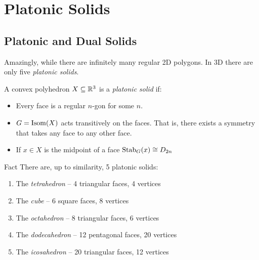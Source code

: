 \documentclass[../main.tex]{subfiles}
\begin{document}
\chapter{Platonic Solids}
\section{Platonic and Dual Solids}
Amazingly, while there are infinitely many regular 2D polygons.
In 3D there are only five \textit{platonic solids}.
\begin{definition}
  A convex polyhedron $X \subseteq \mathbb{R}^3$ is a \textit{platonic solid} if:
  \begin{itemize}
    \item Every face is a regular $n$-gon for some $n$.
    \item $G = \operatorname{Isom} (X)$ acts transitively on the faces.
      That is, there exists a symmetry that takes any face to any other face.
    \item If $x \in X$ is the midpoint of a face $\operatorname{Stab}_G(x) \cong D_{2n}$
  \end{itemize}
\end{definition}
\begin{theoremlike}{Fact}
  There are, up to similarity, 5 platonic solids:
  \begin{enumerate}
    \item The \textit{tetrahedron} -- 4 triangular faces, 4 vertices
    \item The \textit{cube} -- 6 square faces, 8 vertices
    \item The \textit{octahedron} -- 8 triangular faces, 6 vertices
    \item The \textit{dodecahedron} -- 12 pentagonal faces, 20 vertices
    \item The \textit{icosahedron} -- 20 triangular faces, 12 vertices
  \end{enumerate}
\end{theoremlike}
\end{document}

